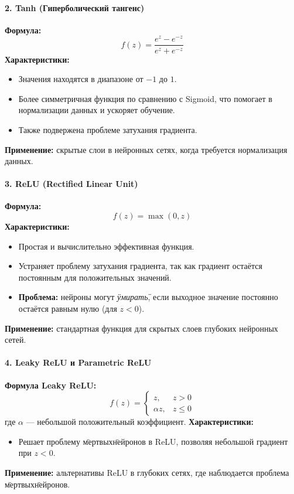 \documentclass[a4paper,12pt]{article}
\begin{document}
\paragraph{2. Tanh (Гиперболический тангенс)}
\textbf{Формула:}
\[
    f(z) = \frac{e^z - e^{-z}}{e^z + e^{-z}}
\]
\textbf{Характеристики:}
\begin{itemize}
    \item Значения находятся в диапазоне от $-1$ до $1$.
    \item Более симметричная функция по сравнению с Sigmoid, что помогает в нормализации данных и ускоряет обучение.
    \item Также подвержена проблеме затухания градиента.
\end{itemize}
\textbf{Применение:} скрытые слои в нейронных сетях, когда требуется нормализация данных.

\paragraph{3. ReLU (Rectified Linear Unit)}
\textbf{Формула:}
\[
    f(z) = \max(0, z)
\]
\textbf{Характеристики:}
\begin{itemize}
    \item Простая и вычислительно эффективная функция.
    \item Устраняет проблему затухания градиента, так как градиент остаётся постоянным для положительных значений.
    \item \textbf{Проблема:} нейроны могут \textit{\"умирать\"}, если выходное значение постоянно остаётся равным нулю (для $z < 0$).
\end{itemize}
\textbf{Применение:} стандартная функция для скрытых слоев глубоких нейронных сетей.

\paragraph{4. Leaky ReLU и Parametric ReLU}
\textbf{Формула Leaky ReLU:}
\[
    f(z) = 
    \begin{cases} 
    z, & z > 0 \\
    \alpha z, & z \leq 0
    \end{cases}
\]
где $\alpha$ — небольшой положительный коэффициент.
\textbf{Характеристики:}
\begin{itemize}
    \item Решает проблему \"мертвых\" нейронов в ReLU, позволяя небольшой градиент при $z < 0$.
\end{itemize}
\textbf{Применение:} альтернативы ReLU в глубоких сетях, где наблюдается проблема \"мертвых\" нейронов.
\end{document}
